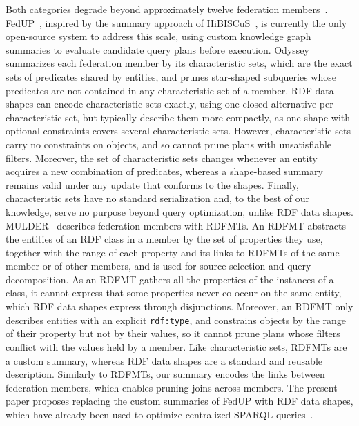 Both categories degrade beyond approximately twelve federation members~\cite{dang2023fedshop}.
FedUP~\cite{aimonierdavat:hal-04538238}, inspired by the summary approach of HiBISCuS~\cite{saleem2014hibiscus}, is currently the only open-source system to address this scale,
using custom knowledge graph summaries to evaluate candidate query plans before execution.
Odyssey~\cite{montoya2017odyssey} summarizes each federation member by its
characteristic sets, which are the exact sets of predicates shared by entities,
and prunes star-shaped subqueries whose predicates are not contained in any
characteristic set of a member.
RDF data shapes can encode characteristic sets exactly, using one closed
alternative per characteristic set, but typically describe them more
compactly, as one shape with optional constraints covers several
characteristic sets.
However, characteristic sets carry no constraints on objects, and so cannot
prune plans with unsatisfiable filters.
Moreover, the set of characteristic sets changes whenever an entity acquires a
new combination of predicates, whereas a shape-based summary remains valid
under any update that conforms to the shapes.
Finally, characteristic sets have no standard serialization and,
to the best of our knowledge, serve no purpose beyond query optimization,
unlike RDF data shapes.
MULDER~\cite{endris2018querying} describes federation members with \acp{RDFMT}.
An \ac{RDFMT} abstracts the entities of an RDF class in a member by the set of
properties they use, together with the range of each property and its links to
\acp{RDFMT} of the same member or of other members, and is used for source
selection and query decomposition.
As an \ac{RDFMT} gathers all the properties of the instances of a class, it
cannot express that some properties never co-occur on the same entity, which
RDF data shapes express through disjunctions.
Moreover, an \ac{RDFMT} only describes entities with an explicit
\texttt{rdf:type}, and constrains objects by the range of their property but
not by their values, so it cannot prune plans whose filters conflict with the
values held by a member.
Like characteristic sets, \acp{RDFMT} are a custom summary, whereas RDF data
shapes are a standard and reusable description.
Similarly to \acp{RDFMT}, our summary encodes the links between federation
members, which enables pruning joins across members.
The present paper proposes replacing the custom summaries of FedUP with RDF data shapes,
which have already been used to optimize centralized SPARQL queries~\cite{kashif2021,Munoz2018}.

